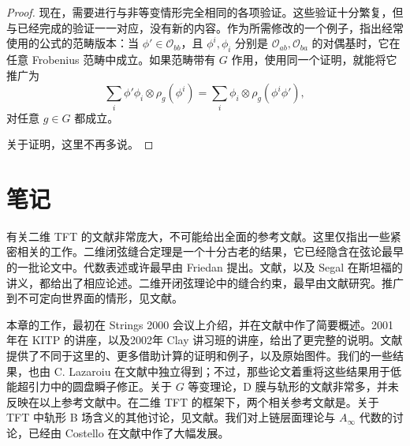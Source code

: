 \begin{proof}
现在，需要进行与非等变情形完全相同的各项验证。这些验证十分繁复，但与已经完成的验证一一对应，没有新的内容。作为所需修改的一个例子，指出经常使用的公式的范畴版本：当 $\phi'\in\mathcal{O}_{bb}$，且 $\phi^i,\phi_i$ 分别是 $\mathcal{O}_{ab},\mathcal{O}_{ba}$ 的对偶基时，它在任意 Frobenius 范畴中成立。如果范畴带有 $G$ 作用，使用同一个证明，就能将它推广为
\[
\sum_i\phi'\phi_i\otimes\rho_g(\phi^i)
=\sum_i\phi_i\otimes\rho_g(\phi^i\phi'),
\]
对任意 $g\in G$ 都成立。

关于证明，这里不再多说。
\end{proof}

\section{笔记}\label{sec:2.8}

\begin{note}
有关二维 TFT 的文献非常庞大，不可能给出全面的参考文献。这里仅指出一些紧密相关的工作。二维闭弦缝合定理是一个十分古老的结果，它已经隐含在弦论最早的一批论文中。代数表述或许最早由 Friedan 提出。文献，以及 Segal 在斯坦福的讲义，都给出了相应论述。二维开闭弦理论中的缝合约束，最早由文献研究。推广到不可定向世界面的情形，见文献。

本章的工作，最初在 Strings 2000 会议上介绍，并在文献中作了简要概述。2001年在 KITP 的讲座，以及2002年 Clay 讲习班的讲座，给出了更完整的说明。文献提供了不同于这里的、更多借助计算的证明和例子，以及原始图件。我们的一些结果，也由 C. Lazaroiu 在文献中独立得到；不过，那些论文着重将这些结果用于低能超引力中的圆盘瞬子修正。关于 $G$ 等变理论，D 膜与轨形的文献非常多，并未反映在以上参考文献中。在二维 TFT 的框架下，两个相关参考文献是。关于 TFT 中轨形 B 场含义的其他讨论，见文献。我们对上链层面理论与 $A_\infty$ 代数的讨论，已经由 Costello 在文献中作了大幅发展。
\end{note}
